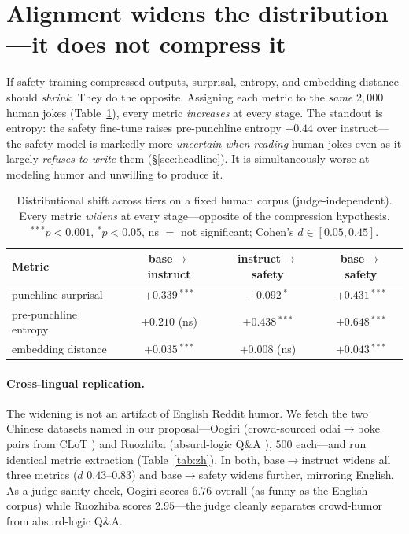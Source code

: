 \documentclass{article}
\begin{document}
\section{Alignment widens the distribution---it does not compress it}
\label{sec:dist}

If safety training compressed outputs, surprisal, entropy, and embedding distance should \emph{shrink}. They do the opposite. Assigning each metric to the \emph{same} $2{,}000$ human jokes (Table~\ref{tab:shift}), every metric \emph{increases} at every stage. The standout is entropy: the safety fine-tune raises pre-punchline entropy $+0.44$ over instruct---the safety model is markedly more \emph{uncertain when reading} human jokes even as it largely \emph{refuses to write} them (\S\ref{sec:headline}). It is simultaneously worse at modeling humor and unwilling to produce it.

\begin{table}[t]
  \caption{Distributional shift across tiers on a fixed human corpus (judge-independent). Every metric \emph{widens} at every stage---opposite of the compression hypothesis. $^{***}p<0.001$, $^{*}p<0.05$, ns $=$ not significant; Cohen's $d\in[0.05,0.45]$.}
  \label{tab:shift}
  \centering
  \begin{tabular}{lccc}
    \toprule
    Metric & base$\to$instruct & instruct$\to$safety & base$\to$safety \\
    \midrule
    punchline surprisal   & $+0.339$\,$^{***}$ & $+0.092$\,$^{*}$   & $+0.431$\,$^{***}$ \\
    pre-punchline entropy & $+0.210$ (ns)      & $+0.438$\,$^{***}$ & $+0.648$\,$^{***}$ \\
    embedding distance    & $+0.035$\,$^{***}$ & $+0.008$ (ns)      & $+0.043$\,$^{***}$ \\
    \bottomrule
  \end{tabular}
\end{table}

\paragraph{Cross-lingual replication.} The widening is not an artifact of English Reddit humor. We fetch the two Chinese datasets named in our proposal---Oogiri (crowd-sourced odai$\to$boke pairs from CLoT \citep{zhong2024clot}) and Ruozhiba (absurd-logic Q\&A \citep{ruozhiba2024}), $500$ each---and run identical metric extraction (Table~\ref{tab:zh}). In both, base$\to$instruct widens all three metrics ($d$ $0.43$--$0.83$) and base$\to$safety widens further, mirroring English. As a judge sanity check, Oogiri scores $6.76$ overall (as funny as the English corpus) while Ruozhiba scores $2.95$---the judge cleanly separates crowd-humor from absurd-logic Q\&A.
\end{document}
